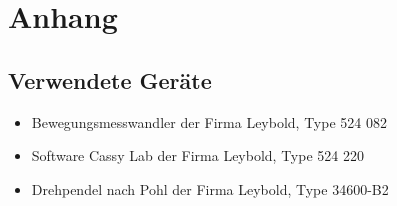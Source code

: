 \documentclass{article}
\renewcommand{\listoffigures}{%
    \begingroup
    \let\section\subsection %
    \tocsection
    \tocfile{\listfigurename}{lof}
    \endgroup
}
\renewcommand{\listoftables}{%
    \begingroup
    \let\section\subsection %
    \tocsection
    \tocfile{\listtablename}{lot}
    \endgroup
}
\begin{document}
\clearpage

\section{Anhang}
\subsection{Verwendete Geräte}
\begin{itemize}
    \itemsep0em
    \item \quad Bewegungsmesswandler der Firma Leybold, Type 524 082
    \item \quad Software Cassy Lab der Firma Leybold, Type 524 220
    \item \quad Drehpendel nach Pohl der Firma Leybold, Type 34600-B2
\end{itemize}
\listoffigures
\listoftables
\printbibheading[title={Literaturverzeichnis},heading=subbibnumbered]
\printbibliography[type=online,heading=subbibliography,title={\indent \textit{Webseiten}}]
\end{document}
